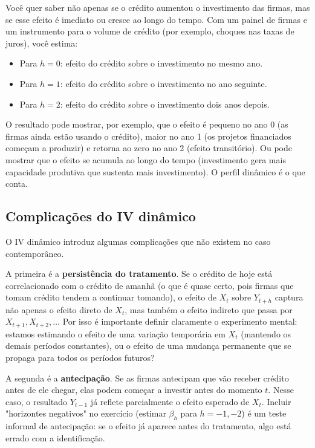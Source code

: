\begin{exemplobox}
Você quer saber não apenas se o crédito aumentou o investimento das firmas, mas se esse efeito é imediato ou cresce ao longo do tempo. Com um painel de firmas e um instrumento para o volume de crédito (por exemplo, choques nas taxas de juros), você estima:
\begin{itemize}[leftmargin=*]
  \item Para $h=0$: efeito do crédito sobre o investimento no mesmo ano.
  \item Para $h=1$: efeito do crédito sobre o investimento no ano seguinte.
  \item Para $h=2$: efeito do crédito sobre o investimento dois anos depois.
\end{itemize}
O resultado pode mostrar, por exemplo, que o efeito é pequeno no ano 0 (as firmas ainda estão usando o crédito), maior no ano 1 (os projetos financiados começam a produzir) e retorna ao zero no ano 2 (efeito transitório). Ou pode mostrar que o efeito se acumula ao longo do tempo (investimento gera mais capacidade produtiva que sustenta mais investimento). O perfil dinâmico é o que conta.
\end{exemplobox}

\subsection*{Complicações do IV dinâmico}

O IV dinâmico introduz algumas complicações que não existem no caso contemporâneo.

A primeira é a \textbf{persistência do tratamento}. Se o crédito de hoje está correlacionado com o crédito de amanhã (o que é quase certo, pois firmas que tomam crédito tendem a continuar tomando), o efeito de $X_t$ sobre $Y_{t+h}$ captura não apenas o efeito direto de $X_t$, mas também o efeito indireto que passa por $X_{t+1}, X_{t+2}, \ldots$ Por isso é importante definir claramente o experimento mental: estamos estimando o efeito de uma variação temporária em $X_t$ (mantendo os demais períodos constantes), ou o efeito de uma mudança permanente que se propaga para todos os períodos futuros?

A segunda é a \textbf{antecipação}. Se as firmas antecipam que vão receber crédito antes de ele chegar, elas podem começar a investir antes do momento $t$. Nesse caso, o resultado $Y_{t-1}$ já reflete parcialmente o efeito esperado de $X_t$. Incluir "horizontes negativos" no exercício (estimar $\beta_h$ para $h = -1, -2$) é um teste informal de antecipação: se o efeito já aparece antes do tratamento, algo está errado com a identificação.


